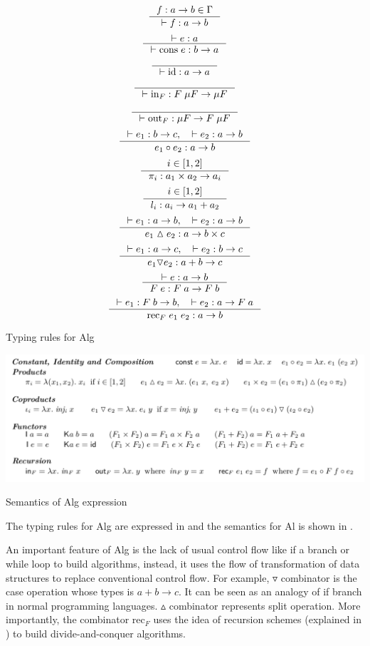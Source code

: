 \begin{table}[ht]
    \[\inference{f : a -> b \in \Gamma}{|- f : a -> b}\]
    \[\inference{|- e : a}{|- \text{cons} \; e : b -> a}\]
    \[\inference{}{|- \text{id} : a -> a}\]
    \[\inference{}{|- \text{in}_F : F \; \mu F -> \mu F}\]
    \[\inference{}{|- \text{out}_F : \mu F -> F \; \mu F}\]
    \[\inference{|- e_1 : b -> c, \quad |- e_2 : a -> b}{e_1 \circ e_2: a -> b}\]
    \[\inference{i \in [1,2]}{\pi_i : a_1 \times a_2 -> a_i}\]
    \[\inference{i \in [1,2]}{l_i : a_i -> a_1 + a_2}\]
    \[\inference{|- e_1 : a -> b, \quad |- e_2 : a -> b}{e_1 \vartriangle e_2: a -> b \times c}\]
    \[\inference{|- e_1 : a -> c, \quad |- e_2 : b -> c}{e_1 \triangledown e_2: a + b -> c}\]
    \[\inference{|- e : a -> b}{F \; e : F \; a -> F \; b}\]
    \[\inference{|- e_1 : F \; b -> b, \quad |- e_2 : a -> F \; a}{\text{rec}_F \; e_1 \; e_2: a -> b}\]
    \caption{Typing rules for Alg}
    \label{project:typing}
\end{table}
\begin{table}[ht]
    \includegraphics[width=\textwidth]{project/semantics.png}
    \caption{Semantics of Alg expression\cite{AlgebraicMultipartyProtocol}} 
    \label{project:Semantics}
\end{table}

The typing rules for Alg are expressed in  and the semantics for Al is shown in . 

An important feature of Alg is the lack of usual control flow like if a branch or while loop to build algorithms, instead, it uses the flow of transformation of data structures to replace conventional control flow. For example, $\triangledown$ combinator is the case operation whose types is $a + b \rightarrow c$. It can be seen as an analogy of if branch in normal programming languages. $\vartriangle$ combinator represents split operation. More importantly, the combinator $\text{rec}_F$ uses the idea of recursion schemes (explained in ) to build divide-and-conquer algorithms. 

